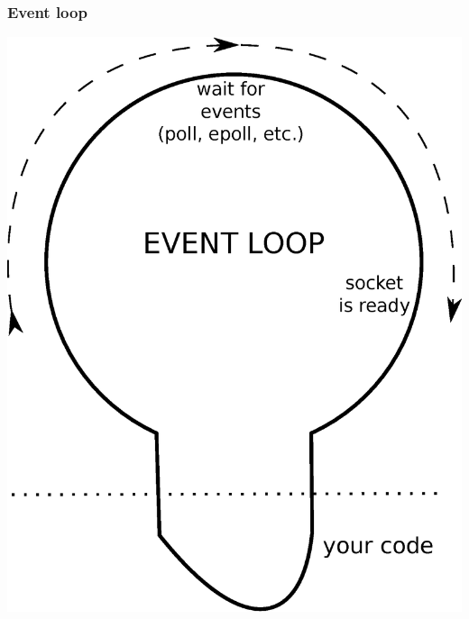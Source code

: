 \documentclass[aspectratio=169]{beamer}
\begin{document}
\begin{frame}[t]
  \frametitle{Event loop}
  \begin{center}
    \includegraphics[scale=0.3]{img/part2_2_eventloop.eps}
  \end{center}
\end{frame}
\end{document}
